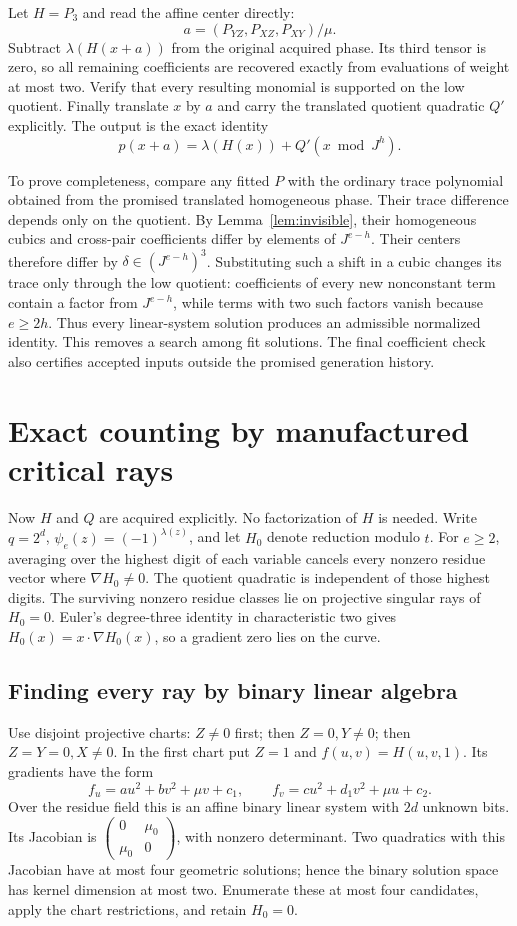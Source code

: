 Let $H=P_3$ and read the affine center directly:
\[
 a=(P_{YZ},P_{XZ},P_{XY})/\mu.
\]
Subtract $\lambda(H(x+a))$ from the original acquired phase. Its third
tensor is zero, so all remaining coefficients are recovered exactly
from evaluations of weight at most two. Verify that every resulting
monomial is supported on the low quotient. Finally translate $x$ by
$a$ and carry the translated quotient quadratic $Q'$ explicitly.
The output is the exact identity
\[
 p(x+a)=\lambda(H(x))+Q'(x\bmod J^h).
\]

To prove completeness, compare any fitted $P$ with the ordinary trace
polynomial obtained from the promised translated homogeneous phase.
Their trace difference depends only on the quotient. By
Lemma~\ref{lem:invisible}, their homogeneous cubics and cross-pair
coefficients differ by elements of $J^{e-h}$. Their centers therefore
differ by $\delta\in(J^{e-h})^3$. Substituting such a shift in a cubic
changes its trace only through the low quotient: coefficients of every
new nonconstant term contain a factor from $J^{e-h}$, while terms
with two such factors vanish because $e\ge2h$.
Thus every linear-system solution produces an admissible normalized
identity. This removes a search among fit solutions.
The final coefficient check also certifies accepted inputs outside the
promised generation history.

\section{Exact counting by manufactured critical rays}\label{sec:criticalrays}
Now $H$ and $Q$ are acquired explicitly. No factorization of $H$ is
needed. Write $q=2^d$, $\psi_e(z)=(-1)^{\lambda(z)}$, and let
$H_0$ denote reduction modulo $t$.
For $e\ge2$, averaging over the highest digit of each variable cancels
every nonzero residue vector where $\nabla H_0\ne0$. The quotient
quadratic is independent of those highest digits. The surviving
nonzero residue classes lie on projective singular rays of $H_0=0$.
Euler's degree-three identity in characteristic two gives
$H_0(x)=x\cdot\nabla H_0(x)$, so a gradient zero lies on the curve.

\subsection{Finding every ray by binary linear algebra}
Use disjoint projective charts: $Z\ne0$ first; then $Z=0,Y\ne0$;
then $Z=Y=0,X\ne0$. In the first chart put $Z=1$ and
$f(u,v)=H(u,v,1)$. Its gradients have the form
\[
 f_u=a u^2+b v^2+\mu v+c_1,\qquad
 f_v=c u^2+d_1 v^2+\mu u+c_2.
\]
Over the residue field this is an affine binary linear system with
$2d$ unknown bits. Its Jacobian is
$\left(\begin{smallmatrix}0&\mu_0\\\mu_0&0\end{smallmatrix}\right)$,
with nonzero determinant. Two quadratics with this Jacobian have at
most four geometric solutions; hence the binary solution space has
kernel dimension at most two. Enumerate these at most four candidates,
apply the chart restrictions, and retain $H_0=0$.

